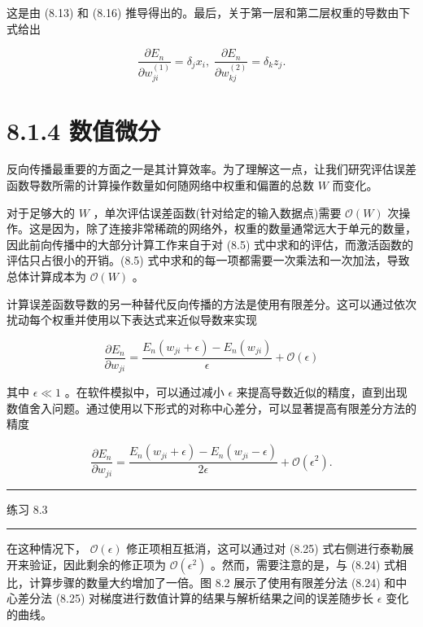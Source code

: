 \documentclass[10pt]{article}
\newcommand{\HRule}{\begin{center}\rule{0.9\linewidth}{0.2mm}\end{center}}
\begin{document}
这是由 (8.13) 和 (8.16) 推导得出的。最后，关于第一层和第二层权重的导数由下式给出

\[
\frac{\partial {E}_{n}}{\partial {w}_{ji}^{\left( 1\right) }} = {\delta }_{j}{x}_{i},\;\frac{\partial {E}_{n}}{\partial {w}_{kj}^{\left( 2\right) }} = {\delta }_{k}{z}_{j}. \tag{8.23}
\]

\section*{8.1.4 数值微分}

反向传播最重要的方面之一是其计算效率。为了理解这一点，让我们研究评估误差函数导数所需的计算操作数量如何随网络中权重和偏置的总数 \(W\) 而变化。

对于足够大的 \(W\) ，单次评估误差函数(针对给定的输入数据点)需要 \(\mathcal{O}\left( W\right)\) 次操作。这是因为，除了连接非常稀疏的网络外，权重的数量通常远大于单元的数量，因此前向传播中的大部分计算工作来自于对 (8.5) 式中求和的评估，而激活函数的评估只占很小的开销。(8.5) 式中求和的每一项都需要一次乘法和一次加法，导致总体计算成本为 \(\mathcal{O}\left( W\right)\) 。

计算误差函数导数的另一种替代反向传播的方法是使用有限差分。这可以通过依次扰动每个权重并使用以下表达式来近似导数来实现

\[
\frac{\partial {E}_{n}}{\partial {w}_{ji}} = \frac{{E}_{n}\left( {{w}_{ji} + \epsilon }\right)  - {E}_{n}\left( {w}_{ji}\right) }{\epsilon } + \mathcal{O}\left( \epsilon \right)  \tag{8.24}
\]

其中 \(\epsilon  \ll  1\) 。在软件模拟中，可以通过减小 \(\epsilon\) 来提高导数近似的精度，直到出现数值舍入问题。通过使用以下形式的对称中心差分，可以显著提高有限差分方法的精度

\[
\frac{\partial {E}_{n}}{\partial {w}_{ji}} = \frac{{E}_{n}\left( {{w}_{ji} + \epsilon }\right)  - {E}_{n}\left( {{w}_{ji} - \epsilon }\right) }{2\epsilon } + \mathcal{O}\left( {\epsilon }^{2}\right) . \tag{8.25}
\]

\HRule

练习 8.3

\HRule

在这种情况下， \(\mathcal{O}\left( \epsilon \right)\) 修正项相互抵消，这可以通过对 (8.25) 式右侧进行泰勒展开来验证，因此剩余的修正项为 \(\mathcal{O}\left( {\epsilon }^{2}\right)\) 。然而，需要注意的是，与 (8.24) 式相比，计算步骤的数量大约增加了一倍。图 8.2 展示了使用有限差分法 (8.24) 和中心差分法 (8.25) 对梯度进行数值计算的结果与解析结果之间的误差随步长 \(\epsilon\) 变化的曲线。
\end{document}
